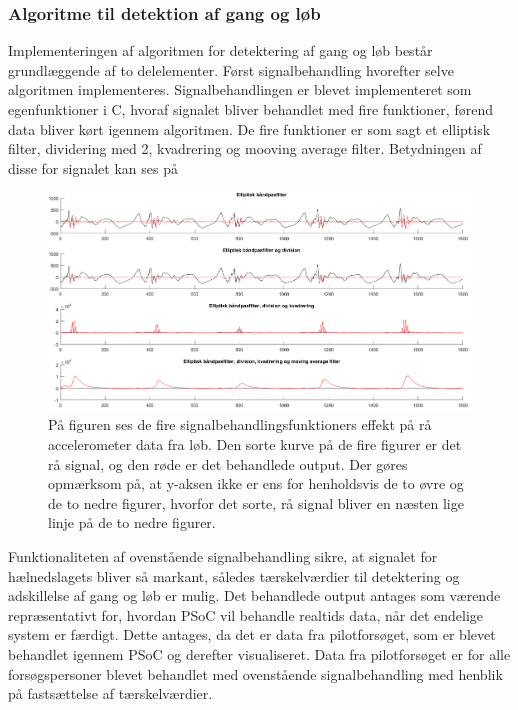 \subsubsection{Algoritme til detektion af gang og løb}
Implementeringen af algoritmen for detektering af gang og løb består grundlæggende af to delelementer. Først signalbehandling hvorefter selve algoritmen implementeres. Signalbehandlingen er blevet implementeret som egenfunktioner i C, hvoraf signalet bliver behandlet med fire funktioner, førend data bliver kørt igennem algoritmen. De fire funktioner er som sagt et elliptisk filter, dividering med 2, kvadrering og mooving average filter. Betydningen af disse for signalet kan ses på 
\begin{figure}[H]
	\centering
	\includegraphics[scale=0.37]{figures/cDesign/signalbehandling_psoc.png}
	\caption{På figuren ses de fire signalbehandlingsfunktioners effekt på rå accelerometer data fra løb. Den sorte kurve på de fire figurer er det rå signal, og den røde er det behandlede output. Der gøres opmærksom på, at y-aksen ikke er ens for henholdsvis de to øvre og de to nedre figurer, hvorfor det sorte, rå signal bliver en næsten lige linje på de to nedre figurer.}
	\label{fig:algoritme_cykling2}
\end{figure}
Funktionaliteten af ovenstående signalbehandling sikre, at signalet for hælnedslagets bliver så markant, således tærskelværdier til detektering og adskillelse af gang og løb er mulig. Det behandlede output antages som værende repræsentativt for, hvordan PSoC vil behandle realtids data, når det endelige system er færdigt. Dette antages, da det er data fra pilotforsøget, som er blevet behandlet igennem PSoC og derefter visualiseret. Data fra pilotforsøget er for alle forsøgspersoner blevet behandlet med ovenstående signalbehandling med henblik på fastsættelse af tærskelværdier. 
